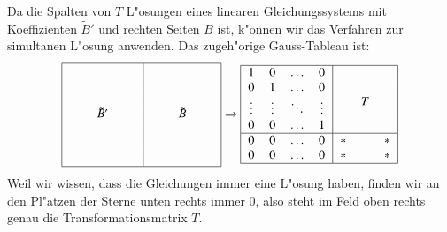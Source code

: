 Da die Spalten von $T$ L"osungen eines linearen Gleichungssystems
mit Koeffizienten $\tilde B'$ und rechten Seiten $B$ ist, k"onnen
wir das Verfahren zur simultanen L"osung anwenden.
Das zugeh"orige Gauss-Tableau ist:
\[
\begin{tabular}{|>{$}c<{$}>{$}c<{$}>{$}c<{$}|>{$}c<{$}>{$}c<{$}>{$}c<{$}|}
\hline
\quad\mathstrut&         &\quad\mathstrut&\quad\mathstrut&        &\quad\mathstrut\\
      &         &      &      &        &      \mathstrut\\
      &         &      &      &        &      \mathstrut\\
      &\tilde B'&      &      &\tilde B&      \mathstrut\\
      &         &      &      &        &      \mathstrut\\
      &         &      &      &        &      \mathstrut\\
      &         &      &      &        &      \mathstrut\\
\hline
\end{tabular}
\rightarrow
\begin{tabular}{|>{$}c<{$}>{$}c<{$}>{$}c<{$}>{$}c<{$}|>{$}c<{$}>{$}c<{$}>{$}c<{$}|}
\hline
1     &     0&\dots   &0      & &                   & \\
0     &     1&\dots   &0      & &                   & \\
\vdots&\vdots&\ddots  &\vdots & &\raisebox{7pt}{$T$}& \\
0     &     0&\dots   &1      & &                   & \\
\hline
0     &     0&\dots   &0      &*&                   &*\\
0     &     0&\dots   &0      &*&                   &*\\
\hline
\end{tabular}
\]
Weil wir wissen, dass die Gleichungen immer eine L"osung haben, finden
wir an den Pl"atzen der Sterne unten rechts immer $0$, also steht im
Feld oben rechts genau die Transformationsmatrix $T$.

